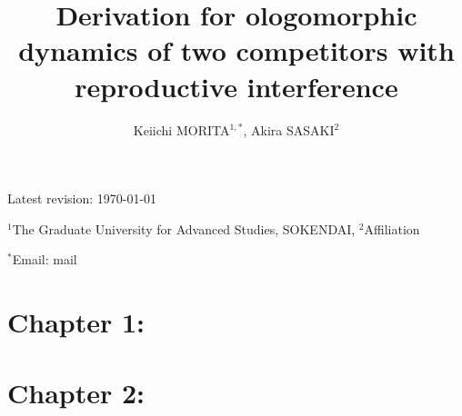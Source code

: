 \documentclass[12pt, a4paper]{article}
\title{Derivation for ologomorphic dynamics of two competitors with reproductive interference}
\author{Keiichi MORITA$^{1,*}$, Akira SASAKI$^2$}
\date{}
\begin{document}
\linenumbers

\begin{center}
Latest revision: \today
\end{center}

{\let\newpage\relax\vspace*{-3em}\maketitle} 

\noindent $^1$The Graduate University for Advanced Studies, SOKENDAI, $^2$Affiliation

\begin{center}
$^*$Email: mail
\end{center}

\section*{Chapter 1: }

\section*{Chapter 2: }
\end{document}
